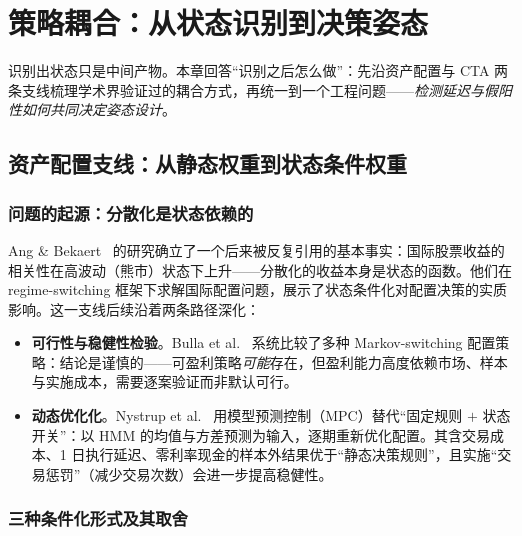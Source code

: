 
\section{策略耦合：从状态识别到决策姿态}
\label{sec:strategy}

识别出状态只是中间产物。本章回答“识别之后怎么做”：先沿资产配置与 CTA 两条支线梳理学术界验证过的耦合方式，再统一到一个工程问题——\emph{检测延迟与假阳性如何共同决定姿态设计}。

\subsection{资产配置支线：从静态权重到状态条件权重}

\subsubsection{问题的起源：分散化是状态依赖的}

Ang \& Bekaert~\cite{ang2002} 的研究确立了一个后来被反复引用的基本事实：国际股票收益的相关性在高波动（熊市）状态下上升——分散化的收益本身是状态的函数。他们在 regime-switching 框架下求解国际配置问题，展示了状态条件化对配置决策的实质影响。这一支线后续沿着两条路径深化：

\begin{itemize}[itemsep=2pt]
\item \textbf{可行性与稳健性检验}。Bulla et al.~\cite{bulla2011} 系统比较了多种 Markov-switching 配置策略：结论是谨慎的——可盈利策略\emph{可能}存在，但盈利能力高度依赖市场、样本与实施成本，需要逐案验证而非默认可行。
\item \textbf{动态优化化}。Nystrup et al.~\cite{nystrup2018} 用模型预测控制（MPC）替代“固定规则 $+$ 状态开关”：以 HMM 的均值与方差预测为输入，逐期重新优化配置。其含交易成本、1 日执行延迟、零利率现金的样本外结果优于“静态决策规则”，且实施“交易惩罚”（减少交易次数）会进一步提高稳健性。
\end{itemize}

\subsubsection{三种条件化形式及其取舍}

